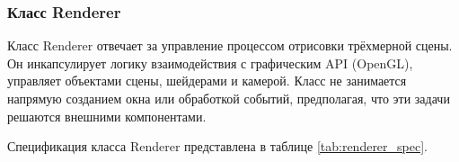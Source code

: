 
\subsubsection{Класс Renderer}
Класс Renderer отвечает за управление процессом отрисовки трёхмерной сцены. Он инкапсулирует логику взаимодействия с графическим API (OpenGL), управляет объектами сцены, шейдерами и камерой. Класс не занимается напрямую созданием окна или обработкой событий, предполагая, что эти задачи решаются внешними компонентами.

Спецификация класса Renderer представлена в таблице \ref{tab:renderer_spec}.

